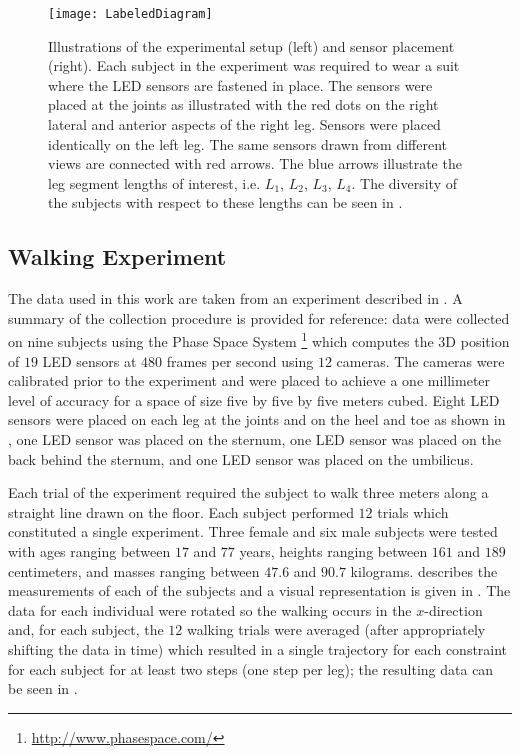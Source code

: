 \begin{figure}[t!]
  \centering
  \texttt{[image: LabeledDiagram]}
  \caption[Illustrations of the experimental setup and sensor
  placement.]{Illustrations of the experimental setup (left) and sensor
    placement (right).
    Each subject in the experiment was required to wear a suit where the LED
    sensors are fastened in place.
    The sensors were placed at the joints as illustrated with the red dots on
    the right lateral and anterior aspects of the right leg.
    Sensors were placed identically on the left leg.
    The same sensors drawn from different views are connected with red arrows.
    The blue arrows illustrate the leg segment lengths of interest,
    i.e. $L_{1}$, $L_{2}$, $L_{3}$, $L_{4}$.
    The diversity of the subjects with respect to these lengths can be seen in
    .}
  \label{fig:Sensors}
\end{figure}

\subsection{Walking Experiment}

The data used in this work are taken from an experiment described in
\cite{Ames2011a}.
%
A summary of the collection procedure is provided for reference:
%
data were collected on nine subjects using the Phase Space System%
%
\footnote{\url{http://www.phasespace.com/}}\xspace
%
which computes the 3D position of $19$ LED sensors at $480$ frames per second
using $12$ cameras.
%
The cameras were calibrated prior to the experiment and were placed to achieve a
one millimeter level of accuracy for a space of size five by five by five meters
cubed.
%
Eight LED sensors were placed on each leg at the joints and on the heel and toe
as shown in , one LED sensor was placed on the sternum, one
LED sensor was placed on the back behind the sternum, and one LED sensor was
placed on the umbilicus.



Each trial of the experiment required the subject to walk three meters along a
straight line drawn on the floor.
%
Each subject performed $12$ trials which constituted a single experiment.
%
Three female and six male subjects were tested with ages ranging between $17$
and $77$ years, heights ranging between $161$ and $189$ centimeters, and masses
ranging between $47.6$ and $90.7$ kilograms.
%
 describes the measurements of each of the subjects and
a visual representation is given in .
%
The data for each individual were rotated so the walking occurs in the
$x$-direction and, for each subject, the $12$ walking trials were averaged
(after appropriately shifting the data in time) which resulted in a single
trajectory for each constraint for each subject for at least two steps (one step
per leg); the resulting data can be seen in .

